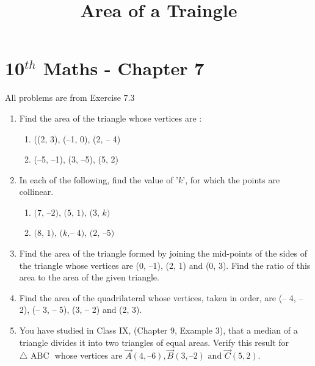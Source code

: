 \documentclass[12pt]{article}
\begin{document}
\begin{center}
\title{\textbf{Area of a Traingle}}
\date{\vspace{-5ex}} %
\maketitle
\end{center}

\setcounter{page}{1}

\section{10$^{th}$ Maths - Chapter 7}

All problems are from Exercise 7.3

\begin{enumerate}
\item Find the area of the triangle whose vertices are :
\begin{enumerate}
\item ((2, 3), (–1, 0), (2, – 4)
\item (–5, –1), (3, –5), (5, 2) 
\end{enumerate}

\item In each of the following, find the value of '$\textit{k}$', for which the points are collinear.
\begin{enumerate}
\item $\text{(7, –2), (5, 1), (3, } \textit{k})$
\item $\text{(8, 1), (}\textit{k}, \text{– 4), (2, –5)}$
\end{enumerate}

\item Find the area of the triangle formed by joining the mid-points of the sides of the triangle whose vertices are (0, –1), (2, 1) and (0, 3). Find the ratio of this area to the area of the given triangle.

\item Find the area of the quadrilateral whose vertices, taken in order, are (– 4, – 2), (– 3, – 5), (3, – 2) and (2, 3).

\item You have studied in Class IX, (Chapter 9, Example 3), that a median of a triangle divides it into two triangles of equal areas. Verify this result for $\triangle \text{ ABC }$ whose vertices are $\vec{A}(4, – 6), \vec{B}(3, –2) \text{ and }  \vec{C}(5, 2)$. 

\end{enumerate}
\end{document}
